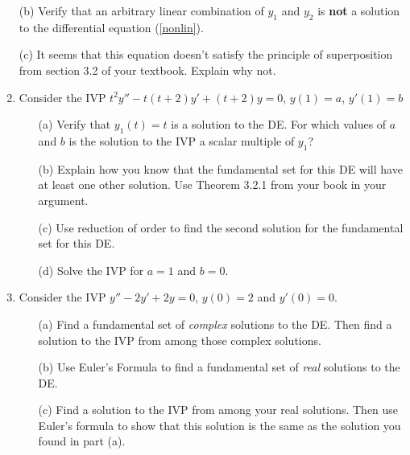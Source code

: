 \documentclass[12pt]{article}
\newcommand{\noi}{\noindent}
\begin{document}
\begin{enumerate}
\noi (b) Verify that an arbitrary linear combination of $y_1$ and $y_2$ is \textbf{not} a solution to the differential equation (\ref{nonlin}).

\noi(c) It seems that this equation doesn't satisfy the principle of superposition from section 3.2 of your textbook.  Explain why not.\\



\item Consider the IVP $t^2y'' - t(t+2)y' + (t+2)y = 0$, $y(1)=a$, $y'(1)=b$
\begin{itemize}
\item[(a)] Verify that $y_1(t) = t$ is a solution to the DE.  For which values of $a$ and $b$ is the solution to the IVP a scalar multiple of $y_1$?
\item[(b)] Explain how you know that the fundamental set for this DE will have at least one other solution.  Use Theorem 3.2.1 from your book in your argument.
\item[(c)] Use reduction of order to find the second solution for the fundamental set for this DE.
\item[(d)] Solve the IVP for $a = 1$ and $b=0$.
\end{itemize}



\item Consider the IVP $y''-2y'+2y = 0$, $y(0) = 2$ and $y'(0) = 0$.  
\begin{itemize}
\item[(a)] Find a fundamental set of \textit{complex} solutions to the DE.  Then find a solution to the IVP from among those complex solutions.
\item[(b)] Use Euler's Formula to find a fundamental set of \textit{real} solutions to the DE.
\item[(c)] Find a solution to the IVP from among your real solutions.  Then use Euler's formula to show that this solution is the same as the solution you found in part (a).
\end{itemize}



\end{enumerate}


\end{document}
